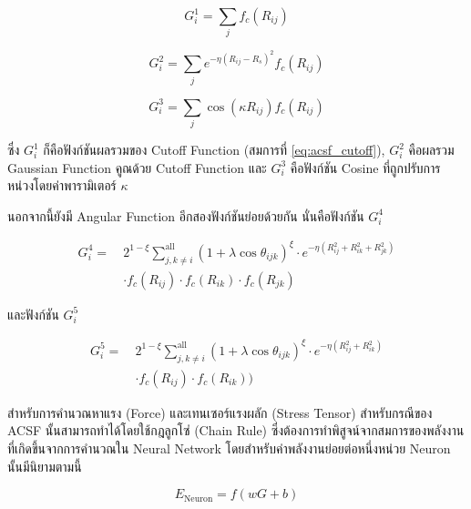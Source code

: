 \begin{equation}\label{eq:rf_g1}
    G^{1}_{i} = \sum_{j} f_{c}(R_{ij})
\end{equation}

\begin{equation}\label{eq:rf_g2}
    G^{2}_{i} = \sum_{j} e^{-\eta(R_{ij} - R_{s})^{2}} f_{c}(R_{ij})
\end{equation}

\begin{equation}\label{eq:rf_g3}
    G^{3}_{i} = \sum_{j} \cos(\kappa R_{ij}) f_{c}(R_{ij})
\end{equation}

\noindent ซึ่ง $G^{1}_{i}$ ก็คือฟังก์ชันผลรวมของ Cutoff Function (สมการที่ \eqref{eq:acsf_cutoff}), $G^{2}_{i}$ คือผลรวม
Gaussian Function คูณด้วย Cutoff Function และ $G^{3}_{i}$ คือฟังก์ชัน Cosine ที่ถูกปรับการหน่วงโดยค่าพารามิเตอร์ $\kappa$

นอกจากนี้ยังมี Angular Function อีกสองฟังก์ชันย่อยด้วยกัน นั่นคือฟังก์ชัน $G^{4}_{i}$

\begin{align}\label{eq:rf_g4}
    G^{4}_{i} =~ & 2^{1 - \xi}\sum^{\text{all}}_{j,k \neq i} (1+\lambda \cos \theta_{ijk})^{\xi}
    \cdot e^{-\eta(R^{2}_{ij} + R^{2}_{ik} + R^{2}_{jk})} \nonumber                              \\
                 & \cdot f_{c}(R_{ij}) \cdot f_{c}(R_{ik}) \cdot f_{c}(R_{jk})
\end{align}

\noindent และฟังก์ชัน $G^{5}_{i}$

\begin{align}\label{eq:rf_g5}
    G^{5}_{i} =~ & 2^{1 - \xi}\sum^{\text{all}}_{j,k \neq i} (1+\lambda \cos \theta_{ijk})^{\xi}
    \cdot e^{-\eta(R^{2}_{ij} + R^{2}_{ik})} \nonumber                                           \\
                 & \cdot f_{c}(R_{ij}) \cdot f_{c}(R_{ik}))
\end{align}

สำหรับการคำนวณหาแรง (Force) และเทนเซอร์แรงผลัก (Stress Tensor) สำหรับกรณีของ ACSF นั้นสามารถทำได้โดยใช้กฎลูกโซ่ (Chain
Rule) ซึ่งต้องการทำพิสูจน์จากสมการของพลังงานที่เกิดขึ้นจากการคำนวณใน Neural Network โดยสำหรับค่าพลังงานย่อยต่อหนึ่งหน่วย Neuron
นั้นมีนิยามตามนี้

\begin{equation}\label{eq:acsf_sub_ener}
    E_{\text{Neuron}} = f(w G + b)
\end{equation}

